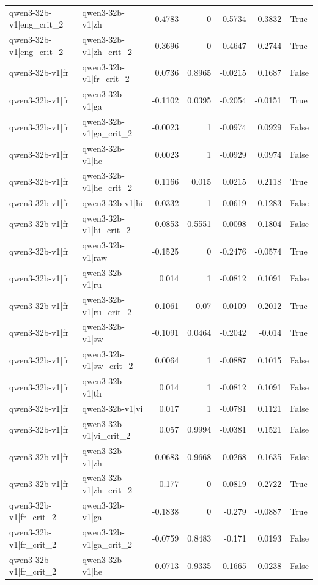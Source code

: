 \begin{table}
\begin{tabular}{l l r r r r l}
qwen3-32b-v1|eng_crit_2 & qwen3-32b-v1|zh & -0.4783 & 0 & -0.5734 & -0.3832 & True \\
qwen3-32b-v1|eng_crit_2 & qwen3-32b-v1|zh_crit_2 & -0.3696 & 0 & -0.4647 & -0.2744 & True \\
qwen3-32b-v1|fr & qwen3-32b-v1|fr_crit_2 & 0.0736 & 0.8965 & -0.0215 & 0.1687 & False \\
qwen3-32b-v1|fr & qwen3-32b-v1|ga & -0.1102 & 0.0395 & -0.2054 & -0.0151 & True \\
qwen3-32b-v1|fr & qwen3-32b-v1|ga_crit_2 & -0.0023 & 1 & -0.0974 & 0.0929 & False \\
qwen3-32b-v1|fr & qwen3-32b-v1|he & 0.0023 & 1 & -0.0929 & 0.0974 & False \\
qwen3-32b-v1|fr & qwen3-32b-v1|he_crit_2 & 0.1166 & 0.015 & 0.0215 & 0.2118 & True \\
qwen3-32b-v1|fr & qwen3-32b-v1|hi & 0.0332 & 1 & -0.0619 & 0.1283 & False \\
qwen3-32b-v1|fr & qwen3-32b-v1|hi_crit_2 & 0.0853 & 0.5551 & -0.0098 & 0.1804 & False \\
qwen3-32b-v1|fr & qwen3-32b-v1|raw & -0.1525 & 0 & -0.2476 & -0.0574 & True \\
qwen3-32b-v1|fr & qwen3-32b-v1|ru & 0.014 & 1 & -0.0812 & 0.1091 & False \\
qwen3-32b-v1|fr & qwen3-32b-v1|ru_crit_2 & 0.1061 & 0.07 & 0.0109 & 0.2012 & True \\
qwen3-32b-v1|fr & qwen3-32b-v1|sw & -0.1091 & 0.0464 & -0.2042 & -0.014 & True \\
qwen3-32b-v1|fr & qwen3-32b-v1|sw_crit_2 & 0.0064 & 1 & -0.0887 & 0.1015 & False \\
qwen3-32b-v1|fr & qwen3-32b-v1|th & 0.014 & 1 & -0.0812 & 0.1091 & False \\
qwen3-32b-v1|fr & qwen3-32b-v1|vi & 0.017 & 1 & -0.0781 & 0.1121 & False \\
qwen3-32b-v1|fr & qwen3-32b-v1|vi_crit_2 & 0.057 & 0.9994 & -0.0381 & 0.1521 & False \\
qwen3-32b-v1|fr & qwen3-32b-v1|zh & 0.0683 & 0.9668 & -0.0268 & 0.1635 & False \\
qwen3-32b-v1|fr & qwen3-32b-v1|zh_crit_2 & 0.177 & 0 & 0.0819 & 0.2722 & True \\
qwen3-32b-v1|fr_crit_2 & qwen3-32b-v1|ga & -0.1838 & 0 & -0.279 & -0.0887 & True \\
qwen3-32b-v1|fr_crit_2 & qwen3-32b-v1|ga_crit_2 & -0.0759 & 0.8483 & -0.171 & 0.0193 & False \\
qwen3-32b-v1|fr_crit_2 & qwen3-32b-v1|he & -0.0713 & 0.9335 & -0.1665 & 0.0238 & False \\

\end{tabular}
\end{table}
